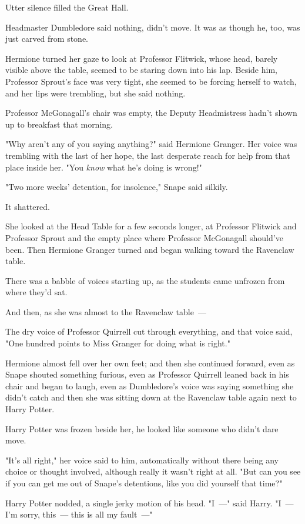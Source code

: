 Utter silence filled the Great Hall.

Headmaster Dumbledore said nothing, didn't move. It was as though he, too, was
just carved from stone.

Hermione turned her gaze to look at Professor Flitwick, whose head, barely
visible above the table, seemed to be staring down into his lap. Beside him,
Professor Sprout's face was very tight, she seemed to be forcing herself to
watch, and her lips were trembling, but she said nothing.

Professor McGonagall's chair was empty, the Deputy Headmistress hadn't shown up
to breakfast that morning.

"Why aren't any of you saying anything?" said Hermione Granger. Her voice was
trembling with the last of her hope, the last desperate reach for help from
that place inside her. "You \emph{know} what he's doing is wrong!"

"Two more weeks' detention, for insolence," Snape said silkily.

It shattered.

She looked at the Head Table for a few seconds longer, at Professor Flitwick
and Professor Sprout and the empty place where Professor McGonagall should've
been. Then Hermione Granger turned and began walking toward the Ravenclaw table.

There was a babble of voices starting up, as the students came unfrozen from
where they'd sat.

And then, as she was almost to the Ravenclaw table~---

The dry voice of Professor Quirrell cut through everything, and that voice
said, "One hundred points to Miss Granger for doing what is right."

Hermione almost fell over her own feet; and then she continued forward, even as
Snape shouted something furious, even as Professor Quirrell leaned back in his
chair and began to laugh, even as Dumbledore's voice was saying something she
didn't catch and then she was sitting down at the Ravenclaw table again next to
Harry Potter.

Harry Potter was frozen beside her, he looked like someone who didn't dare move.

"It's all right," her voice said to him, automatically without there being any
choice or thought involved, although really it wasn't right at all. "But can
you see if you can get me out of Snape's detentions, like you did yourself that
time?"

Harry Potter nodded, a single jerky motion of his head. "I~---" said Harry.
"I~--- I'm sorry, this~--- this is all my fault~---"

